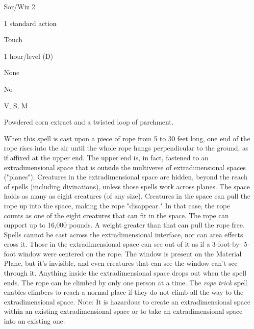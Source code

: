 
\begin{description*}
\item[Level:] Sor/Wiz 2
\item[Casting Time:] 1 standard action
\item[Range:] Touch
\item[Duration:] 1 hour/level (D)
\item[Saving Throw:] None
\item[Spell Resistance:] No
\item[Components:] V, S, M
\item[Arcane Material Component:] Powdered corn extract and a twisted loop of parchment.
\end{description*}

When this spell is cast upon a piece of rope from 5 to 30 feet long, one end of
the rope rises into the air until the whole rope hangs perpendicular to the ground,
as if affixed at the upper end. The upper end is, in fact, fastened to an extradimensional
space that is outside the multiverse of extradimensional spaces ("planes"). Creatures
in the extradimensional space are hidden, beyond the reach of spells (including
divinations), unless those spells work across planes. The space holds as many as
eight creatures (of any size). Creatures in the space can pull the rope up into
the space, making the rope "disappear." In that case, the rope counts as one
of the eight creatures that can fit in the space. The rope can support up to 16,000
pounds. A weight greater than that can pull the rope free.
Spells cannot be cast across the extradimensional interface, nor can area effects
cross it. Those in the extradimensional space can see out of it as if a 3-foot-by-
5-foot window were centered on the rope. The window is present on the Material
Plane, but it's invisible, and even creatures that can see the window can't see
through it. Anything inside the extradimensional space drops out when the spell
ends. The rope can be climbed by only one person at a time. The \textit{rope trick
}spell enables climbers to reach a normal place if they do not climb all the way
to the extradimensional space.
Note: It is hazardous to create an extradimensional space within an existing
extradimensional space or to take an extradimensional space into an existing one.